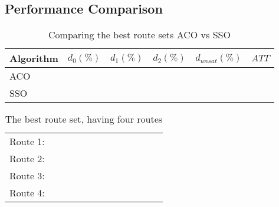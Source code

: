 \subsection{Performance Comparison}
\label{subsec:performanceComparison_results}

\begin{table}[H]
    \centering
    \begin{tabular}{|l||l|l|l|l|l|}
    \hline
    Algorithm & $d_0(\%)$ & $d_1(\%)$ & $d_2(\%)$ & $d_{unsat}(\%)$ & $ATT$ \\
    \hline
    ACO &  &  &  &  &  \\
    \hline
    \hline
    SSO & ~ & ~ & ~ & ~ & ~ \\
    \hline
    \end{tabular}
    \caption {Comparing the best route sets ACO vs SSO}
    \label{table:performanceComparison_ACO}
    \end{table}

\begin{table}[H]
	\centering
    \begin{tabular}{|l|l l l l l l l l|}
    \hline
    Route 1: & ~ & ~ & ~ & ~ & ~ & ~ & ~ & ~ \\
    Route 2: & ~ & ~ & ~ & ~ & ~ & ~ & ~ & ~ \\
    Route 3: & ~ & ~ & ~ & ~ & ~ & ~ & ~ & ~ \\
    Route 4: & ~ & ~ & ~ & ~ & ~ & ~ & ~ & ~ \\
	\hline
    \end{tabular}
    \caption {The best route set, having four routes}
    \label{table:performanceComparison_bestRouteSet4}
	\end{table}


